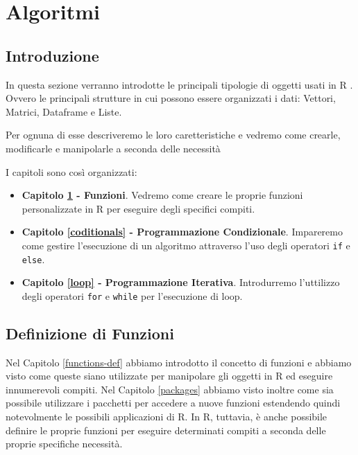 \documentclass[
]{book}
\providecommand{\tightlist}{%
  \setlength{\itemsep}{0pt}\setlength{\parskip}{0pt}}
\begin{document}
\hypertarget{part-algoritmi}{%
\part*{Algoritmi}\label{part-algoritmi}}

\hypertarget{third-section}{%
\chapter*{Introduzione}\label{third-section}}

In questa sezione verranno introdotte le principali tipologie di oggetti usati in R . Ovvero le principali strutture in cui possono essere organizzati i dati: Vettori, Matrici, Dataframe e Liste.

Per ognuna di esse descriveremo le loro caretteristiche e vedremo come crearle, modificarle e manipolarle a seconda delle necessità

I capitoli sono così organizzati:

\begin{itemize}
\tightlist
\item
  \textbf{Capitolo \ref{functions} - Funzioni}. Vedremo come creare le proprie funzioni personalizzate in R per eseguire degli specifici compiti.
\item
  \textbf{Capitolo \ref{coditionals} - Programmazione Condizionale}. Impareremo come gestire l'esecuzione di un algoritmo attraverso l'uso degli operatori \texttt{if} e \texttt{else}.
\item
  \textbf{Capitolo \ref{loop} - Programmazione Iterativa}. Introdurremo l'uttilizzo degli operatori \texttt{for} e \texttt{while} per l'esecuzione di loop.
\end{itemize}

\hypertarget{functions}{%
\chapter{Definizione di Funzioni}\label{functions}}

Nel Capitolo \ref{functions-def} abbiamo introdotto il concetto di funzioni e abbiamo visto come queste siano utilizzate per manipolare gli oggetti in R ed eseguire innumerevoli compiti. Nel Capitolo \ref{packages} abbiamo visto inoltre come sia possibile utilizzare i pacchetti per accedere a nuove funzioni estendendo quindi notevolmente le possibili applicazioni di R. In R, tuttavia, è anche possibile definire le proprie funzioni per eseguire determinati compiti a seconda delle proprie specifiche necessità.
\end{document}
